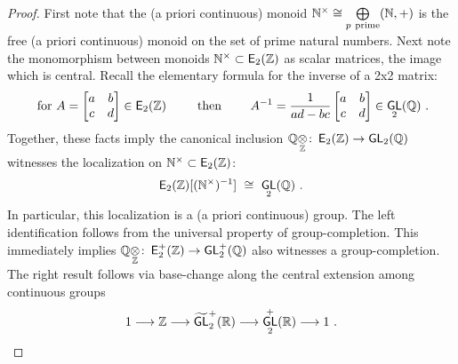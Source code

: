 \documentclass{amsart}
\theoremstyle{definition}
\theoremstyle{remark}
\def\ot{\otimes}
\newcommand{\w}{\widetilde}
\def\QQ{\mathbb Q}\def\RR{\mathbb R}\def\SS{\mathbb S}\def\TT{\mathbb T}
\def\sE{\mathsf E}\def\sF{\mathsf F}\def\sG{\mathsf G}\def\sH{\mathsf H}
\DeclareMathOperator{\GL}{\sf GL}
\DeclareMathOperator{\EZ}{\sE_2(\ZZ)}
\DeclareMathOperator{\EpZ}{\sE^+_2(\ZZ)}
\begin{document}
\begin{proof}
First note that the (a priori continuous) monoid $\mathbb N^\times\cong \underset{p~{\rm prime}} \bigoplus (\mathbb N,+)$ is the free (a priori continuous) monoid on the set of prime natural numbers.  
Next note the monomorphism between monoids $\NN^\times \subset \EZ$ as scalar matrices, the image which is central.  
Recall the elementary formula for the inverse of a 2x2 matrix:
\[
\text{ for }A = \begin{bmatrix} a & b \\ c & d  \end{bmatrix}\in \EZ
\qquad
\text{ then }
\qquad
A^{-1} = \frac{1}{ad-bc}\begin{bmatrix} a & b \\ c & d  \end{bmatrix} \in \GL_2(\QQ)
~.
\]
Together, these facts imply the canonical inclusion $\QQ\underset{\ZZ}\ot \colon \EZ \to \GL_2(\QQ)$ witnesses the localization on $\NN^\times \subset \EZ$:
\[
\EZ[ (\NN^\times)^{-1} ]
~\cong~
\GL_2(\QQ)
~.
\]
In particular, this localization is a (a priori continuous) group.
The left identification follows from the universal property of group-completion.
This immediately implies $\QQ\underset{\ZZ}\ot \colon \EpZ \to \GL_2^+(\QQ)$ also witnesses a group-completion.  
The right result follows via base-change along the central extension among continuous groups
\[
1
\longrightarrow
\ZZ
\longrightarrow
\w{\GL}_2^+(\RR)
\longrightarrow
\GL_2^+(\RR)
\longrightarrow
1
~.
\]

\end{proof}
\end{document}
